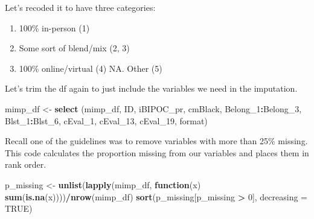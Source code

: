 \documentclass[
  11pt,
]{book}
\newenvironment{Shaded}{\begin{snugshade}}{\end{snugshade}}
\newcommand{\AttributeTok}[1]{\textcolor[rgb]{0.27,0.27,0.27}{#1}}
\newcommand{\CommentTok}[1]{\textcolor[rgb]{0.37,0.37,0.37}{\textit{#1}}}
\newcommand{\ConstantTok}[1]{\textcolor[rgb]{0.37,0.37,0.37}{#1}}
\newcommand{\ControlFlowTok}[1]{\textcolor[rgb]{0.27,0.27,0.27}{\textbf{#1}}}
\newcommand{\DecValTok}[1]{\textcolor[rgb]{0.06,0.06,0.06}{#1}}
\newcommand{\FunctionTok}[1]{\textcolor[rgb]{0.27,0.27,0.27}{\textbf{#1}}}
\newcommand{\NormalTok}[1]{#1}
\newcommand{\OtherTok}[1]{\textcolor[rgb]{0.37,0.37,0.37}{#1}}
\newcommand{\SpecialCharTok}[1]{\textcolor[rgb]{0.43,0.43,0.43}{\textbf{#1}}}
\newcommand{\StringTok}[1]{\textcolor[rgb]{0.5,0.5,0.5}{#1}}
\providecommand{\tightlist}{%
  \setlength{\itemsep}{0pt}\setlength{\parskip}{0pt}}
\begin{document}
Let's recoded it to have three categories:

\begin{enumerate}
\def\labelenumi{\arabic{enumi}.}
\setcounter{enumi}{-1}
\tightlist
\item
  100\% in-person (1)
\item
  Some sort of blend/mix (2, 3)
\item
  100\% online/virtual (4) NA. Other (5)
\end{enumerate}

\begin{Shaded}
\end{Shaded}

Let's trim the df again to just include the variables we need in the imputation.

\begin{Shaded}
\begin{Highlighting}[]
\NormalTok{mimp\_df }\OtherTok{\textless{}{-}}  \FunctionTok{select}\NormalTok{ (mimp\_df, ID, iBIPOC\_pr, cmBlack, Belong\_1}\SpecialCharTok{:}\NormalTok{Belong\_3, Blst\_1}\SpecialCharTok{:}\NormalTok{Blst\_6, cEval\_1, cEval\_13, cEval\_19, format)}
\end{Highlighting}
\end{Shaded}

Recall one of the guidelines was to remove variables with more than 25\% missing. This code calculates the proportion missing from our variables and places them in rank order.

\begin{Shaded}
\begin{Highlighting}[]
\NormalTok{p\_missing }\OtherTok{\textless{}{-}} \FunctionTok{unlist}\NormalTok{(}\FunctionTok{lapply}\NormalTok{(mimp\_df, }\ControlFlowTok{function}\NormalTok{(x) }\FunctionTok{sum}\NormalTok{(}\FunctionTok{is.na}\NormalTok{(x))))}\SpecialCharTok{/}\FunctionTok{nrow}\NormalTok{(mimp\_df)}
\FunctionTok{sort}\NormalTok{(p\_missing[p\_missing }\SpecialCharTok{\textgreater{}} \DecValTok{0}\NormalTok{], }\AttributeTok{decreasing =} \ConstantTok{TRUE}\NormalTok{)}
\end{Highlighting}
\end{Shaded}
\end{document}
